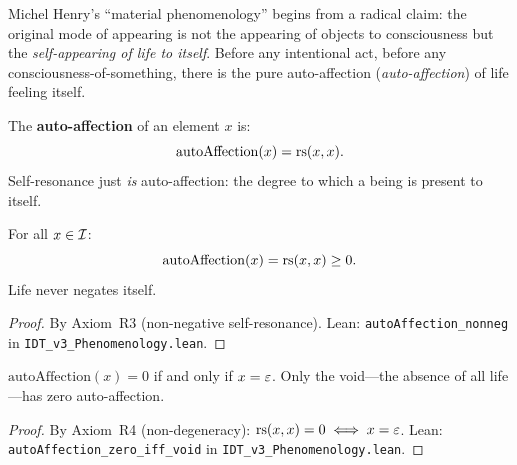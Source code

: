 Michel Henry's ``material phenomenology'' begins from a radical claim:
the original mode of appearing is not the appearing of objects to consciousness
but the \emph{self-appearing of life to itself}.  Before any intentional act,
before any consciousness-of-something, there is the pure auto-affection
(\textit{auto-affection}) of life feeling itself.

\begin{definition}
\label{def:auto-affection}
The \textbf{auto-affection} of an element $x$ is:
\[
\mathrm{autoAffection}(x) = \mathrm{rs}(x, x).
\]
Self-resonance just \emph{is} auto-affection: the degree to which a being
is present to itself.
\end{definition}

\begin{theorem}
\label{thm:auto-affection-nonneg}
For all $x \in \mathcal{I}$:
\[
\mathrm{autoAffection}(x) = \mathrm{rs}(x, x) \geq 0.
\]
Life never negates itself.
\end{theorem}

\begin{proof}
By Axiom~R3 (non-negative self-resonance).
Lean: \texttt{autoAffection\_nonneg} in \texttt{IDT\_v3\_Phenomenology.lean}.
\end{proof}

\begin{theorem}
\label{thm:auto-affection-void}
$\mathrm{autoAffection}(x) = 0$ if and only if $x = \varepsilon$.
Only the void---the absence of all life---has zero auto-affection.
\end{theorem}

\begin{proof}
By Axiom~R4 (non-degeneracy): $\mathrm{rs}(x, x) = 0 \iff x = \varepsilon$.
Lean: \texttt{autoAffection\_zero\_iff\_void} in \texttt{IDT\_v3\_Phenomenology.lean}.
\end{proof}

